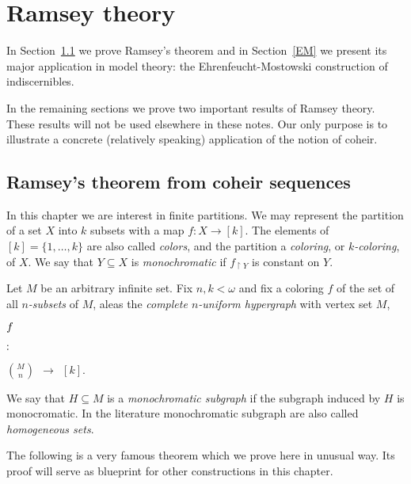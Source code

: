 \documentclass[creche.tex]{subfiles}
\begin{document}
\chapter{Ramsey theory}
\label{ramsey}

In Section~\ref{Ramsey} we prove Ramsey's theorem and in Section~\ref{EM} we present its major application in model theory: 
the Ehrenfeucht-Mostowski construction of indiscernibles.

In the remaining sections we prove two important results of Ramsey theory.
These results will not be used elsewhere in these notes.
Our only purpose is to illustrate a concrete (relatively speaking) application of the notion of coheir.

\def\medrel#1{\parbox[t]{6ex}{$\displaystyle\hfil #1$}}
\def\ceq#1#2#3{\parbox[t]{12ex}{$\displaystyle #1$}\medrel{#2}{$\displaystyle #3$}}



\section{Ramsey's theorem from coheir sequences}
\label{Ramsey}

In this chapter we are interest in finite partitions.
We may represent the partition of a set $X$ into $k$ subsets with a map $f:X\to [k]$.
The elements of $[k]=\{1,\dots,k\}$ are also called \emph{colors},
and the partition a \emph{coloring},
or \emph{$k$-coloring}, of $X$.
We say that $Y\subseteq X$ is \emph{monochromatic\/} if $f_{\restriction Y}$ is constant on $Y$.

Let $M$ be an arbitrary infinite set.
Fix $n,k<\omega$ and fix a coloring $f$ of the set of all \emph{$n$-subsets} of $M$,
aleas the \emph{complete $n$-uniform hypergraph\/} with vertex set $M$,

\ceq{\hfill f}{:}{ \binom{M}{n}\ \ \to\ \ [k]}.

We say that $H\subseteq M$ is a \emph{monochromatic subgraph\/} if the subgraph induced by $H$ is monocromatic.
In the literature monochromatic subgraph are also called \emph{homogeneous sets}.

The following is a very famous theorem which we prove here in unusual way.
Its proof will serve as blueprint for other constructions in this chapter.
\end{document}
